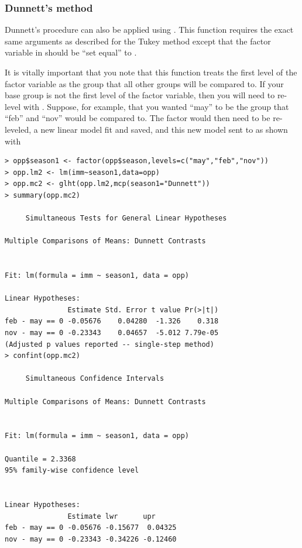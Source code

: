 \documentclass[10pt,openany]{book}\usepackage[]{graphicx}\usepackage[]{color}
\makeatletter
\newenvironment{kframe}{%
 \def\at@end@of@kframe{}%
 \ifinner\ifhmode%
  \def\at@end@of@kframe{\end{minipage}}%
  \begin{minipage}{\columnwidth}%
 \fi\fi%
 \def\FrameCommand##1{\hskip\@totalleftmargin \hskip-\fboxsep
 \colorbox{shadecolor}{##1}\hskip-\fboxsep
     \hskip-\linewidth \hskip-\@totalleftmargin \hskip\columnwidth}%
 \MakeFramed {\advance\hsize-\width
   \@totalleftmargin\z@ \linewidth\hsize
   \@setminipage}}%
 {\par\unskip\endMakeFramed%
 \at@end@of@kframe}
\newenvironment{knitrout}{}{} %
\makeatother
\begin{document}
\subsubsection*{Dunnett's method}
Dunnett's procedure can also be applied using .  This function requires the exact same arguments as described for the Tukey method except that the factor variable in  should be ``set equal'' to .

It is vitally important that you note that this function treats the first level of the factor variable as the group that all other groups will be compared to.  If your base group is not the first level of the factor variable, then you will need to re-level with .  Suppose, for example, that you wanted ``may'' to be the group that ``feb'' and ``nov'' would be compared to.  The factor would then need to be re-leveled, a new linear model fit and saved, and this new model sent to  as shown with

\begin{knitrout}
\color{fgcolor}\begin{kframe}
\begin{verbatim}
> opp$season1 <- factor(opp$season,levels=c("may","feb","nov"))
> opp.lm2 <- lm(imm~season1,data=opp)
> opp.mc2 <- glht(opp.lm2,mcp(season1="Dunnett"))
> summary(opp.mc2)

	 Simultaneous Tests for General Linear Hypotheses

Multiple Comparisons of Means: Dunnett Contrasts


Fit: lm(formula = imm ~ season1, data = opp)

Linear Hypotheses:
               Estimate Std. Error t value Pr(>|t|)
feb - may == 0 -0.05676    0.04280  -1.326    0.318
nov - may == 0 -0.23343    0.04657  -5.012 7.79e-05
(Adjusted p values reported -- single-step method)
> confint(opp.mc2)

	 Simultaneous Confidence Intervals

Multiple Comparisons of Means: Dunnett Contrasts


Fit: lm(formula = imm ~ season1, data = opp)

Quantile = 2.3368
95% family-wise confidence level
 

Linear Hypotheses:
               Estimate lwr      upr     
feb - may == 0 -0.05676 -0.15677  0.04325
nov - may == 0 -0.23343 -0.34226 -0.12460
\end{verbatim}
\end{kframe}
\end{knitrout}
\end{document}
